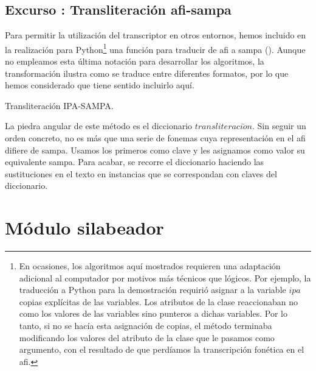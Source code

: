 \subsection{Excurso : Transliteración \ac{afi}-\ac{sampa}}\label{met:ipa2sampa}
Para permitir la utilización del transcriptor en otros entornos, hemos incluido en la realización para Python\footnote{En ocasiones, los algoritmos aquí mostrados requieren una adaptación adicional al computador por motivos más técnicos que lógicos. Por ejemplo, la traducción a Python para la demostración requirió asignar a la variable $ipa$ copias explícitas de las variables. Los atributos de la clase reaccionaban no como los valores de las variables sino punteros a dichas variables. Por lo tanto, si no se hacía esta asignación de copias, el método terminaba modificando los valores del atributo de la clase que le pasamos como argumento, con el resultado de que perdíamos la transcripción fonética en el \ac{afi}.} una función para traducir de \ac{afi} a \ac{sampa} (). Aunque no empleamos esta última notación para desarrollar los algoritmos, la transformación ilustra como se traduce entre diferentes formatos, por lo que hemos considerado que tiene sentido incluirlo aquí.

\begin{algorithm}[!ht] %
	\caption{Transliteración IPA-SAMPA.}\label{list:ipasampa}
\end{algorithm}

La piedra angular de este método es el  diccionario $transliteraci\acute{o}n$. Sin seguir un orden concreto, no es más que una serie de fonemas cuya representación en el \ac{afi} difiere de \ac{sampa}. Usamos los primeros como clave y les asignamos como valor su equivalente \ac{sampa}. Para acabar, se recorre el diccionario haciendo las sustituciones en el texto en instancias que se correspondan con claves del diccionario.

\section{Módulo silabeador}\label{sec:silabeador}
